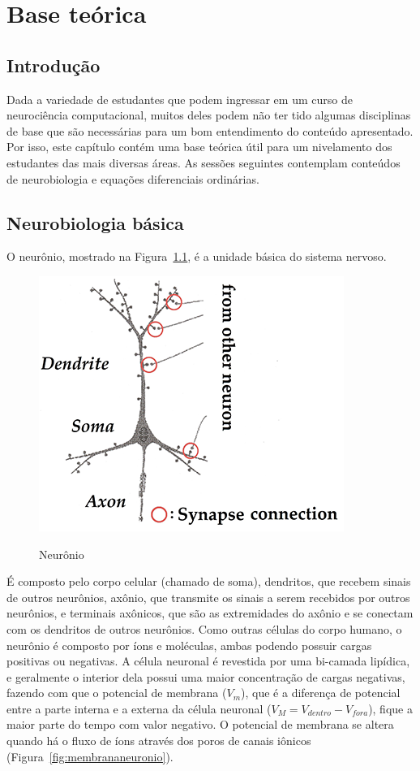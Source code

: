 \chapter{Base teórica}\label{cap:teoria}
\section{Introdução}\label{sec:teoria_intro}
Dada a variedade de estudantes que podem ingressar em um curso de neurociência computacional, muitos deles podem não ter tido algumas disciplinas de base que são necessárias para um bom entendimento do conteúdo apresentado. Por isso, este capítulo contém uma base teórica útil para um nivelamento dos estudantes das mais diversas áreas. As sessões seguintes contemplam conteúdos de neurobiologia e equações diferenciais ordinárias. %

\section{Neurobiologia básica}\label{sec:fisiologia}
O neurônio, mostrado na Figura~\ref{fig:neuronio}, é a unidade básica do sistema nervoso.
\begin{figure}[tb]
	\centering
	\caption[Neurônio]{Neurônio}
	\includegraphics[width=0.55\linewidth]{figs/neuronio}
	\label{fig:neuronio}
\end{figure}
É composto pelo corpo celular (chamado de soma), dendritos, que recebem sinais de outros neurônios, axônio, que transmite os sinais a serem recebidos por outros neurônios, e terminais axônicos, que são as extremidades do axônio e se conectam com os dendritos de outros neurônios. Como outras células do corpo humano, o neurônio é composto por íons e moléculas, ambas podendo possuir cargas positivas ou negativas. A célula neuronal é revestida por uma bi-camada lipídica, e geralmente o interior dela possui uma maior concentração de cargas negativas, fazendo com que o potencial de membrana ($V_m$), que é a diferença de potencial entre a parte interna e a externa da célula neuronal ($V_M=V_{dentro}-V_{fora}$), fique a maior parte do tempo com valor negativo. O potencial de membrana se altera quando há o fluxo de íons através dos poros de canais iônicos (Figura~\ref{fig:membrananeuronio}).

